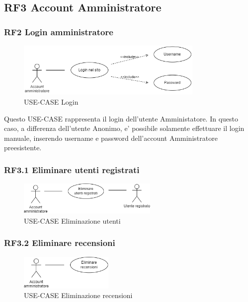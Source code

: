 \documentclass[a4paper,12pt]{article}
\begin{document}
\subsection*{RF3 Account Amministratore}
\subsubsection*{RF2 Login amministratore}
\begin{figure}[H]
   \centering
   \includegraphics[width=0.8\textwidth]{img-D2/login_amministratore.png}
    \caption{USE-CASE Login}
\end{figure}

Questo USE-CASE rappresenta il login dell'utente Amministatore.
In questo caso, a differenza dell'utente Anonimo, e' possibile solamente effettuare il login manuale, inserendo username e password dell'account Amministratore preesistente. 

\subsubsection*{RF3.1 Eliminare utenti registrati}
\begin{figure}[H]
   \centering
   \includegraphics[width=0.6\textwidth]{img-D2/eliminazione_utenti.png}
    \caption{USE-CASE Eliminazione utenti}
\end{figure}

\subsubsection*{RF3.2 Eliminare recensioni}
\begin{figure}[H]
   \centering
   \includegraphics[width=0.4\textwidth]{img-D2/eliminazione_recensioni.png}
    \caption{USE-CASE Eliminazione recensioni}
\end{figure}
\end{document}
